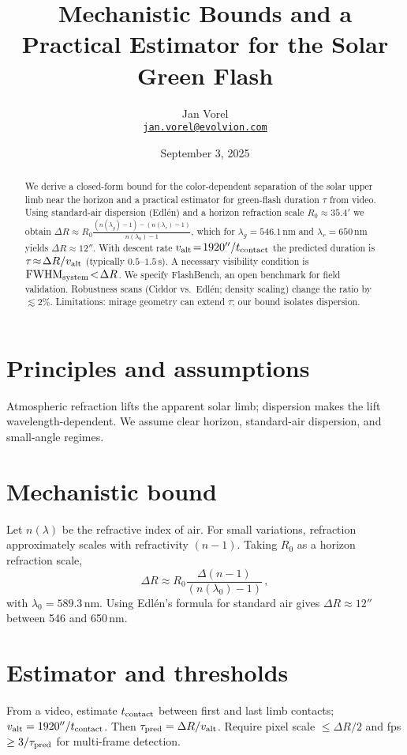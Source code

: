 \documentclass[11pt]{article}
\title{Mechanistic Bounds and a Practical Estimator for the Solar Green Flash}
\author{%
  Jan Vorel\\
  \texttt{\href{mailto:jan.vorel@evolvion.com}{jan.vorel@evolvion.com}}
}
\date{September 3, 2025}
\begin{document}
\maketitle
\begin{abstract}
We derive a closed-form bound for the color-dependent separation of the solar upper limb near the horizon and a practical estimator for green-flash duration $\tau$ from video. Using standard-air dispersion (Edl\'en) and a horizon refraction scale $R_0\!\approx\!35.4'$ we obtain
$\Delta R \approx R_0\frac{(n(\lambda_g)\!-\!1)-(n(\lambda_r)\!-\!1)}{n(\lambda_0)\!-\!1}$, which for $\lambda_g\!=\!546.1$\,nm and $\lambda_r\!=\!650$\,nm yields $\Delta R\!\approx\!12''$. With descent rate $v_{\rm alt}\!=\!1920''/t_{\rm contact}$ the predicted duration is $\tau\!\approx\!\Delta R/v_{\rm alt}$ (typically $0.5$--$1.5$\,s). A necessary visibility condition is ${\rm FWHM}_{\rm system}\!<\!\Delta R$. We specify FlashBench, an open benchmark for field validation. Robustness scans (Ciddor vs.\ Edl\'en; density scaling) change the ratio by $\lesssim$2\%. Limitations: mirage geometry can extend $\tau$; our bound isolates dispersion. 
\end{abstract}

\section{Principles and assumptions}
Atmospheric refraction lifts the apparent solar limb; dispersion makes the lift wavelength-dependent. We assume clear horizon, standard-air dispersion, and small-angle regimes.

\section{Mechanistic bound}
Let $n(\lambda)$ be the refractive index of air. For small variations, refraction approximately scales with refractivity $(n\!-\!1)$. Taking $R_0$ as a horizon refraction scale,
\begin{equation}
\Delta R \approx R_0\frac{\Delta(n-1)}{(n(\lambda_0)-1)}\,,
\end{equation}
with $\lambda_0=589.3$\,nm. Using Edl\'en's formula for standard air gives $\Delta R\approx 12''$ between 546 and 650\,nm.

\section{Estimator and thresholds}
From a video, estimate $t_{\rm contact}$ between first and last limb contacts; $v_{\rm alt}=1920''/t_{\rm contact}$. Then $\tau_{\rm pred}=\Delta R/v_{\rm alt}$. Require pixel scale $\le \Delta R/2$ and fps $\ge 3/\tau_{\rm pred}$ for multi-frame detection.
\end{document}
